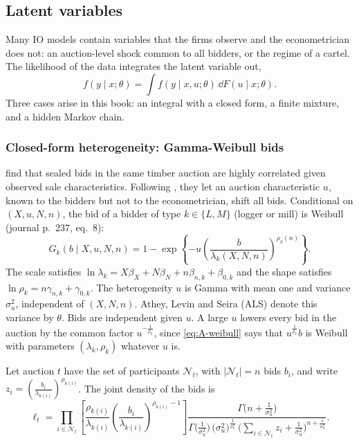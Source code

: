 \subsection{Latent variables}\label{sec:A-mle-latent}

Many IO models contain variables that the firms observe and the econometrician does not: an auction-level shock common
to all bidders, or the regime of a cartel. The likelihood of the data integrates the latent variable out,
\begin{equation*}
  f(y \mid x;\theta) = \int f(y \mid x, u;\theta)\,\dd F(u \mid x;\theta).
\end{equation*}
Three cases arise in this book: an integral with a closed form, a finite mixture, and a hidden Markov chain.

\subsubsection*{Closed-form heterogeneity: Gamma-Weibull bids}

\citet{AtheyLevinSeira2011} find that sealed bids in the same timber auction are highly correlated given observed sale
characteristics. Following \citet{Krasnokutskaya2011}, they let an auction characteristic $u$, known to the bidders but not
to the econometrician, shift all bids. Conditional on $(X, u, N, n)$, the bid of a bidder of type $k \in \{L, M\}$ (logger or
mill) is Weibull (journal p.~237, eq.~8):
\begin{equation}\label{eq:A-weibull}
  G_k(b \mid X, u, N, n) = 1 - \exp\left\{-u\left(\frac{b}{\lambda_k(X, N, n)}\right)^{\rho_k(n)}\right\}.
\end{equation}
The scale satisfies $\ln\lambda_k = X\beta_X + N\beta_N + n\beta_{n,k} + \beta_{0,k}$ and the shape satisfies
$\ln\rho_k = n\gamma_{n,k} + \gamma_{0,k}$. The heterogeneity $u$ is Gamma with mean one and variance $\sigma_u^2$,
independent of $(X, N, n)$. Athey, Levin and Seira (ALS) denote this variance by $\theta$. Bids are independent given $u$. A large $u$ lowers every
bid in the auction by the common factor $u^{-\frac{1}{\rho_k}}$, since \eqref{eq:A-weibull} says that $u^{\frac{1}{\rho_k}}b$
is Weibull with parameters $(\lambda_k, \rho_k)$ whatever $u$ is.

\begin{proposition}\label{prop:A-gamma-weibull}
Let auction $t$ have the set of participants $\mathcal{N}_t$, with $\lvert\mathcal{N}_t\rvert = n$ bids $b_i$, and write
$z_i = (\frac{b_i}{\lambda_{k(i)}})^{\rho_{k(i)}}$. The joint density of the bids is
\begin{equation}\label{eq:A-gw-lik}
  \ell_t = \prod_{i \in \mathcal{N}_t}\left[\frac{\rho_{k(i)}}{\lambda_{k(i)}}\left(\frac{b_i}{\lambda_{k(i)}}\right)^{\rho_{k(i)} - 1}\right]
  \frac{\Gamma\big(n + \frac{1}{\sigma_u^2}\big)}{\Gamma\big(\frac{1}{\sigma_u^2}\big)\,
  \big(\sigma_u^2\big)^{\frac{1}{\sigma_u^2}}\,\big(\sum_{i \in \mathcal{N}_t}z_i + \frac{1}{\sigma_u^2}\big)^{n + \frac{1}{\sigma_u^2}}}.
\end{equation}
\end{proposition}

